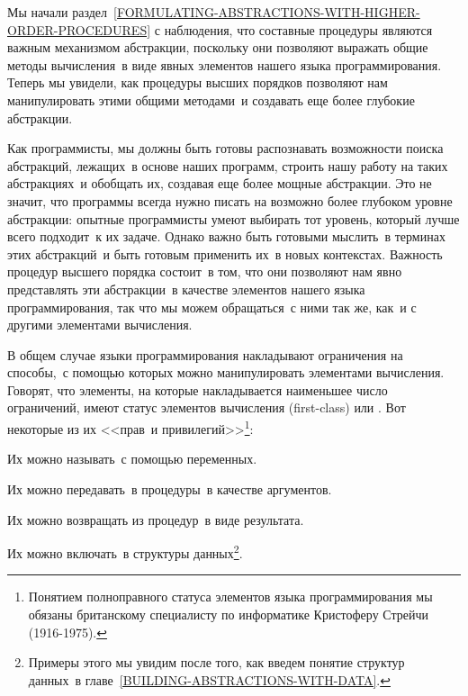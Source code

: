 Мы начали раздел~\ref{FORMULATING-ABSTRACTIONS-WITH-HIGHER-ORDER-PROCEDURES}
с наблюдения, что составные процедуры являются важным механизмом
абстракции, поскольку они позволяют выражать общие методы вычисления~в 
виде явных элементов нашего языка программирования.  Теперь мы
увидели, как процедуры высших порядков позволяют нам манипулировать
этими общими методами~и создавать еще более глубокие абстракции.

Как программисты, мы должны быть готовы распознавать
возможности поиска абстракций, лежащих~в основе наших программ,
строить нашу работу на таких абстракциях~и обобщать их, создавая еще
более мощные абстракции.  Это не значит, что программы
всегда нужно писать на возможно более глубоком уровне абстракции:
опытные программисты умеют выбирать тот уровень, который лучше всего
подходит~к их задаче.  Однако важно быть готовыми мыслить~в терминах
этих абстракций~и быть готовым применить их~в новых контекстах.
Важность процедур высшего порядка состоит~в том, что они позволяют нам 
явно представлять эти абстракции~в качестве элементов нашего языка
программирования, так что мы можем обращаться~с ними так же, как~и с
другими элементами вычисления.

В общем случае языки программирования накладывают
ограничения на способы,~с помощью которых можно манипулировать элементами
вычисления.  Говорят, что элементы, на которые накладывается наименьшее число
ограничений, имеют статус элементов вычисления 
 (first-class) или . Вот
некоторые из их <<прав~и привилегий>>\footnote{Понятием полноправного статуса элементов языка
программирования мы обязаны британскому специалисту по информатике Кристоферу Стрейчи (1916-1975).
}:

\begin{plainlist}

\item
Их можно называть~с помощью переменных.

\item
Их можно передавать~в процедуры~в качестве аргументов.

\item
Их можно возвращать из процедур~в виде результата.

\item
Их можно включать~в структуры данных\footnote{Примеры этого мы увидим после того, как введем
понятие структур данных~в главе~\ref{BUILDING-ABSTRACTIONS-WITH-DATA}.
}.
\end{plainlist}

